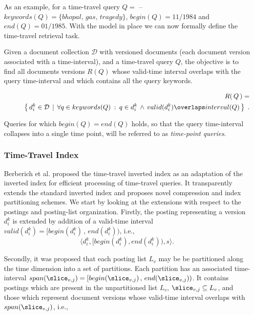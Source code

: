 As an example, for a time-travel query $Q = $  --  $keywords(Q) = \{ bhopal, \,gas, \,tragedy\}$, $begin(Q) = 11/1984$ and $end(Q) = 01/1985$. With the model in place we can now formally define the time-travel retrieval task. 

\begin{definition} Given a document collection $\mathcal{D}$ with versioned documents (each document version associated with a time-interval), and a time-travel query $Q$, the objective is to find all documents versions $R(Q)$ whose valid-time interval overlaps with the query time-interval and which contains all the query keywords.

\begin{eqnarray*}
  & & R(\,Q\,) = \\
  & & \quad\quad\left\{\, d_i^k\in\mathcal{D} \:\:|\:\: \forall{q\in
      keywords(Q)}\::\: q\in d_i^k \,\wedge\, valid(d_i^k) \overlaps interval(Q) \,\right\}\;.
\end{eqnarray*}

\end{definition}

Queries for which $begin(Q)=end(Q)$ holds, so that the query time-interval collapses into a single time point, will be referred to as
\textit{time-point queries}. 

\subsubsection{Time-Travel Index}
 Berberich et al. proposed the time-travel inverted index as an adaptation of the inverted index for efficient processing of time-travel queries. It transparently extends the standard inverted index and proposes novel compression and index partitioning schemes. We start by looking at the extensions with respect to the postings and posting-list organization. Firstly, the posting representing a version $d_i^k$ is extended by addition of a valid-time interval $valid(d_i^k) = [begin(d_i^k) \,,\, end(d_i^k))$, i.e.,
$$
  \langle d_i^k, [begin(d_i^{k}), end(d_i^{k})), s\rangle.
$$

Secondly, it was proposed that each posting list $L_v$ may be be partitioned along the time dimension into a set of partitions. Each partition has an associated time-interval $span(\slice_{v,j}) = [begin(\slice_{v,j})\,,\, end(\slice_{v,j}))$. 
It contains postings which are present in the unpartitioned list $L_v$, $\slice_{v,j} \subseteq L_v$, and those which represent document versions whose valid-time interval overlaps with $span(\slice_{v,j}) $, i.e.,

